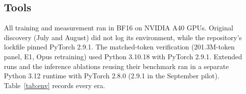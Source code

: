 \documentclass{article}
\newif\ifshowhumanmarkers \showhumanmarkersfalse
\newcommand{\humantag}[1]{{\color{humanframe}\sffamily\scriptsize\bfseries HUMAN AUTHOR MUST REWRITE/VERIFY [#1]}\ }
\newcommand{\humanauthor}[2][]{\ifshowhumanmarkers\begin{humanbox}\humantag{#1}#2\end{humanbox}\else #2\par\fi}
\begin{document}
\subsection{Tools}
\humanauthor[P2-03 r6]{All training and measurement ran in BF16 on NVIDIA A40 GPUs. Original discovery (July and August) did not log its environment, while the repository's lockfile pinned PyTorch 2.9.1. The matched-token verification (201.3M-token panel, E1, Opus retraining) used Python 3.10.18 with PyTorch 2.9.1. Extended runs and the inference ablations reusing their benchmark ran in a separate Python 3.12 runtime with PyTorch 2.8.0 (2.9.1 in the September pilot). Table~\ref{tab:env} records every era.}
\end{document}
